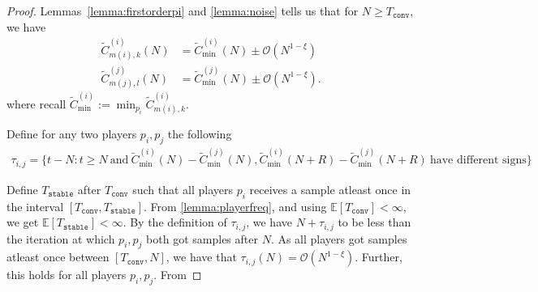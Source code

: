 \documentclass{article}
\newcommand{\E}{\mathbb{E}}
\begin{document}
\begin{proof}
    Lemmas~\ref{lemma:firstorderpi} and \ref{lemma:noise} tells us that for $N\geq T_{\texttt{conv}}$, we have
\begin{align*}
    \tilde{C}^{(i)}_{m(i),k}(N) &=\tilde{C}^{(i)}_{\min}(N) \pm \mathcal{O}\left(N^{1-\xi}\right)\\
    \tilde{C}^{(j)}_{m(j),l}(N) &= \tilde{C}^{(j)}_{\min}(N) \pm \mathcal{O}\left(N^{1-\xi}\right).
\end{align*}
where recall $\tilde{C}^{(i)}_{\min}:=\min_{p_i}\tilde{C}^{(i)}_{m(i),k}$.

Define for any two players $p_i,p_j$ the following
\begin{align*}
    \tau_{i,j} = \{t-N: t\geq N\ \text{and}\ \tilde{C}^{(i)}_{\min}(N)-\tilde{C}^{(j)}_{\min}(N), \tilde{C}^{(i)}_{\min}(N+R)-\tilde{C}^{(j)}_{\min}(N+R)\ \text{have different signs}\}
\end{align*}

Define $T_{\texttt{stable}}$ after $T_{\texttt{conv}}$ such that all players $p_i$ receives a sample atleast once in the interval $[T_{\texttt{conv}},T_{\texttt{stable}}]$. From \ref{lemma:playerfreq}, and using $\E[T_{\texttt{conv}}]<\infty$, we get $\E[T_{\texttt{stable}}]<\infty$. By the definition of $ \tau_{i,j}$, we have $N+ \tau_{i,j}$ to be less than the iteration at which $p_i,p_j$ both got samples after $N$. As all players got samples atleast once between $[T_{\texttt{conv}},N]$, we have that $\tau_{i,j}(N)=\mathcal{O}(N^{1-\xi})$. Further, this holds for all players $p_i,p_j$. From




\end{proof}
\end{document}
